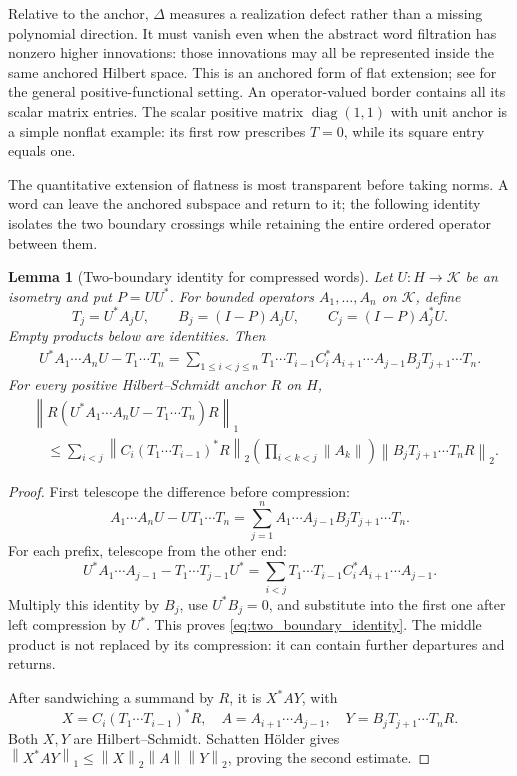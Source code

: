 \documentclass[11pt,a4paper]{amsart}
\numberwithin{equation}{section}
\newtheorem{lemma}[theorem]{Lemma}
\theoremstyle{definition}
\theoremstyle{remark}
\DeclareMathOperator{\diag}{diag}
\newcommand{\norm}[1]{\left\lVert#1\right\rVert}
\begin{document}
Relative to the anchor, $\Delta$ measures a realization defect rather than a missing polynomial direction. It must vanish even when the abstract word filtration has nonzero higher innovations: those innovations may all be represented inside the same anchored Hilbert space. This is an anchored form of flat extension; see \cite{MS} for the general positive-functional setting. An operator-valued border contains all its scalar matrix entries. The scalar positive matrix $\diag(1,1)$ with unit anchor is a simple nonflat example: its first row prescribes $T=0$, while its square entry equals one.

The quantitative extension of flatness is most transparent before taking norms. A word can leave the anchored subspace and return to it; the following identity isolates the two boundary crossings while retaining the entire ordered operator between them.

\begin{lemma}[Two-boundary identity for compressed words]\label{lem:compressed_word_identity}
Let $U:H\to\mathcal K$ be an isometry and put $P=UU^*$. For bounded operators $A_1,\ldots,A_n$ on $\mathcal K$, define
\[
 T_j=U^*A_jU,\qquad
 B_j=(I-P)A_jU,\qquad C_j=(I-P)A_j^*U.
\]
Empty products below are identities. Then
\begin{equation}\label{eq:two_boundary_identity}
 \begin{split}
 U^*A_1\cdots A_nU-T_1\cdots T_n
 =\sum_{1\le i<j\le n}
  T_1\cdots T_{i-1}C_i^*
  A_{i+1}\cdots A_{j-1}B_jT_{j+1}\cdots T_n.
 \end{split}
\end{equation}
For every positive Hilbert--Schmidt anchor $R$ on $H$,
\begin{equation}\label{eq:two_boundary_anchored}
 \begin{split}
 &\norm{R(U^*A_1\cdots A_nU-T_1\cdots T_n)R}_1\\
 &\quad\le\sum_{i<j}
 \norm{C_i(T_1\cdots T_{i-1})^*R}_2
 \left(\prod_{i<k<j}\norm{A_k}\right)
 \norm{B_jT_{j+1}\cdots T_nR}_2.
 \end{split}
\end{equation}
\end{lemma}
\begin{proof}
First telescope the difference before compression:
\[
 A_1\cdots A_nU-UT_1\cdots T_n
 =\sum_{j=1}^n A_1\cdots A_{j-1}B_jT_{j+1}\cdots T_n.
\]
For each prefix, telescope from the other end:
\[
 U^*A_1\cdots A_{j-1}-T_1\cdots T_{j-1}U^*
 =\sum_{i<j}T_1\cdots T_{i-1}C_i^*A_{i+1}\cdots A_{j-1}.
\]
Multiply this identity by $B_j$, use $U^*B_j=0$, and substitute into the first one after left compression by $U^*$. This proves \eqref{eq:two_boundary_identity}. The middle product is not replaced by its compression: it can contain further departures and returns.

After sandwiching a summand by $R$, it is $X^*AY$, with
\[
 X=C_i(T_1\cdots T_{i-1})^*R,
 \quad A=A_{i+1}\cdots A_{j-1},
 \quad Y=B_jT_{j+1}\cdots T_nR.
\]
Both $X,Y$ are Hilbert--Schmidt. Schatten H\"older gives
$\norm{X^*AY}_1\le\norm X_2\norm A\norm Y_2$, proving the second estimate.
\end{proof}
\end{document}
